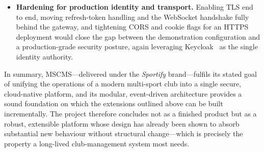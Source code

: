 \begin{itemize}
  \item \textbf{Hardening for production identity and transport.} Enabling TLS end to
        end, moving refresh-token handling and the WebSocket handshake fully behind the
        gateway, and tightening CORS and cookie flags for an HTTPS deployment would close
        the gap between the demonstration configuration and a production-grade security
        posture, again leveraging Keycloak~\cite{keycloak} as the single identity authority.
\end{itemize}

In summary, MSCMS---delivered under the \textit{Sportify} brand---fulfils its stated
goal of unifying the operations of a modern multi-sport club into a single secure,
cloud-native platform, and its modular, event-driven architecture provides a sound
foundation on which the extensions outlined above can be built incrementally. The project
therefore concludes not as a finished product but as a robust, extensible platform whose
design has already been shown to absorb substantial new behaviour without structural
change---which is precisely the property a long-lived club-management system most needs.
